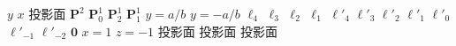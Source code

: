 \documentclass[uplatex]{jsarticle}
\begin{document}
\stopmpxshipout
\mpxshipout%
$y$%
\stopmpxshipout
\mpxshipout%
$x$%
\stopmpxshipout
\mpxshipout%
投影面%
\stopmpxshipout
\mpxshipout%
%
\stopmpxshipout
\mpxshipout%
$\mathbf P^2$%
\stopmpxshipout
\mpxshipout%
$\mathbf P^1_0$%
\stopmpxshipout
\mpxshipout%
$\mathbf P^1_2$%
\stopmpxshipout
\mpxshipout%
$\mathbf P^1_1$%
\stopmpxshipout
\mpxshipout%
$y=a/b$%
\stopmpxshipout
\mpxshipout%
$y=-a/b$%
\stopmpxshipout
\mpxshipout%
$\ell_4$%
\stopmpxshipout
\mpxshipout%
$\ell_3$%
\stopmpxshipout
\mpxshipout%
$\ell_2$%
\stopmpxshipout
\mpxshipout%
$\ell_1$%
\stopmpxshipout
\mpxshipout%
${\ell'}_4$%
\stopmpxshipout
\mpxshipout%
${\ell'}_3$%
\stopmpxshipout
\mpxshipout%
${\ell'}_2$%
\stopmpxshipout
\mpxshipout%
${\ell'}_1$%
\stopmpxshipout
\mpxshipout%
${\ell'}_0$%
\stopmpxshipout
\mpxshipout%
${\ell'}_{-1}$%
\stopmpxshipout
\mpxshipout%
${\ell'}_{-2}$%
\stopmpxshipout
\mpxshipout%
$\mathbf 0$%
\stopmpxshipout
\mpxshipout%
$x=1$%
\stopmpxshipout
\mpxshipout%
$z=-1$%
\stopmpxshipout
\mpxshipout%
投影面%
\stopmpxshipout
\mpxshipout%
投影面%
\stopmpxshipout
\mpxshipout%
投影面%
\stopmpxshipout
\mpxshipout%
%
\stopmpxshipout
\mpxshipout%
%
\stopmpxshipout
\mpxshipout%
$ $%
\stopmpxshipout
\mpxshipout%
$ $%
\stopmpxshipout
\end{document}
